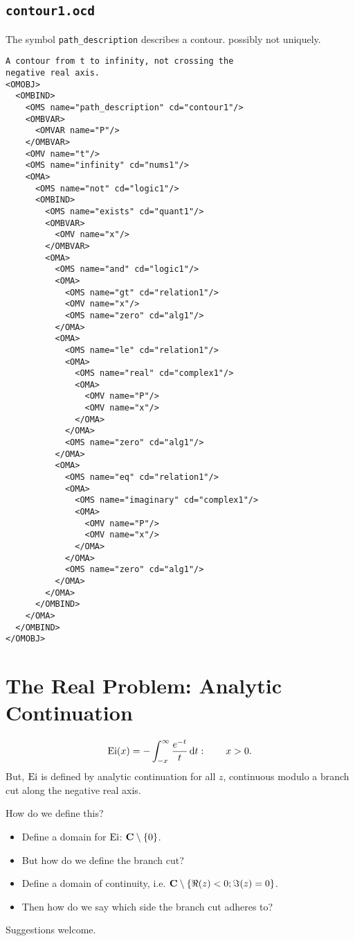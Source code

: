 \documentclass[11pt,a4paper]{artikel3}
\begin{document}
\subsection{{\tt contour1.ocd}}
The symbol \verb+path_description+ describes a contour. possibly not
uniquely.
\begin{verbatim}
A contour from t to infinity, not crossing the
negative real axis.
<OMOBJ>
  <OMBIND>
    <OMS name="path_description" cd="contour1"/>
    <OMBVAR>
      <OMVAR name="P"/>
    </OMBVAR>
    <OMV name="t"/>
    <OMS name="infinity" cd="nums1"/>
    <OMA>
      <OMS name="not" cd="logic1"/>
      <OMBIND>
        <OMS name="exists" cd="quant1"/>
        <OMBVAR>
          <OMV name="x"/>
        </OMBVAR>
        <OMA>
          <OMS name="and" cd="logic1"/>
          <OMA>
            <OMS name="gt" cd="relation1"/>
            <OMV name="x"/>
            <OMS name="zero" cd="alg1"/>
          </OMA>
          <OMA>
            <OMS name="le" cd="relation1"/>
            <OMA>
              <OMS name="real" cd="complex1"/>
              <OMA>
                <OMV name="P"/>
                <OMV name="x"/>
              </OMA>
            </OMA>
            <OMS name="zero" cd="alg1"/>
          </OMA>
          <OMA>
            <OMS name="eq" cd="relation1"/>
            <OMA>
              <OMS name="imaginary" cd="complex1"/>
              <OMA>
                <OMV name="P"/>
                <OMV name="x"/>
              </OMA>
            </OMA>
            <OMS name="zero" cd="alg1"/>
          </OMA>
        </OMA>
      </OMBIND>
    </OMA>
  </OMBIND>
</OMOBJ>
\end{verbatim}
\section{The Real Problem: Analytic Continuation}
$$\mathop{\rm Ei}\nolimits(x)=-\int_{-x}^\infty\frac{e^{-t}}t\,{\rm d}t:\qquad x>0.$$
But, $\mathop{\rm Ei}\nolimits$ is defined by analytic continuation for all $z$, continuous
modulo a branch cut along the negative real axis.
\par\noindent
How do we define this?
\begin{itemize}
\item Define a domain for $\mathop{\rm Ei}\nolimits$: ${\bf C}\setminus\{0\}$.
\item[]But how do we define the branch cut?
\item Define a domain of continuity, i.e.
${\bf C}\setminus\{\Re(z)<0;\Im(z)=0\}$.
\item[]Then how do we say which side the branch cut adheres to?
\end{itemize}
Suggestions welcome.
\end{document}
